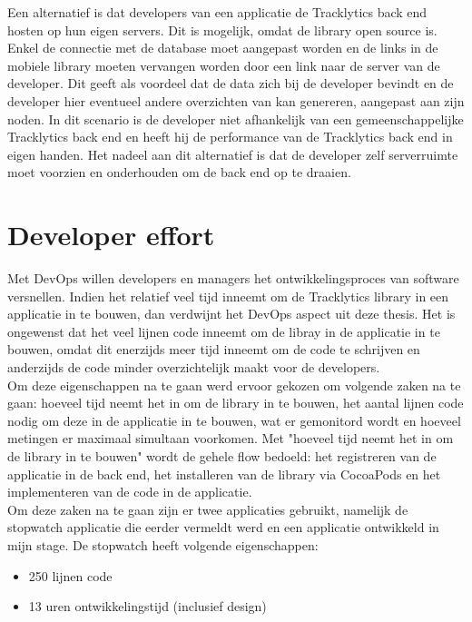 Een alternatief is dat developers van een applicatie de Tracklytics back end hosten op hun eigen servers. Dit is mogelijk, omdat de library open source is. Enkel de connectie met de database moet aangepast worden en de links in de mobiele library moeten vervangen worden door een link naar de server van de developer. Dit geeft als voordeel dat de data zich bij de developer bevindt en de developer hier eventueel andere overzichten van kan genereren, aangepast aan zijn noden. In dit scenario is de developer niet afhankelijk van een gemeenschappelijke Tracklytics back end en heeft hij de performance van de Tracklytics back end in eigen handen. Het nadeel aan dit alternatief is dat de developer zelf serverruimte moet voorzien en onderhouden om de back end op te draaien. \\


\section{Developer effort}\label{Section:Effort}
Met DevOps willen developers en managers het ontwikkelingsproces van software versnellen. Indien het relatief veel tijd inneemt om de Tracklytics library in een applicatie in te bouwen, dan verdwijnt het DevOps aspect uit deze thesis. Het is ongewenst dat het veel lijnen code inneemt om de libray in de applicatie in te bouwen, omdat dit enerzijds meer tijd inneemt om de code te schrijven en anderzijds de code minder overzichtelijk maakt voor de developers. \\

Om deze eigenschappen na te gaan werd ervoor gekozen om volgende zaken na te gaan: hoeveel tijd neemt het in om de library in te bouwen, het aantal lijnen code nodig om deze in de applicatie in te bouwen, wat er gemonitord wordt en hoeveel metingen er maximaal simultaan voorkomen. Met "hoeveel tijd neemt het in om de library in te bouwen"  wordt de gehele flow bedoeld: het registreren van de applicatie in de back end, het installeren van de library via CocoaPods en het implementeren van de code in de applicatie. \\

Om deze zaken na te gaan zijn er twee applicaties gebruikt, namelijk de stopwatch applicatie die eerder vermeldt werd en een applicatie ontwikkeld in mijn stage. De stopwatch heeft volgende eigenschappen:
\begin{itemize}
\item 250 lijnen code
\item 13 uren ontwikkelingstijd (inclusief design)
\end{itemize} 

